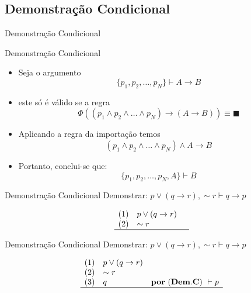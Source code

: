 \subsection{Demonstração Condicional}

\begin{frame}[t]
\vskip 3cm
\begin{center}
{\Huge Demonstração Condicional}
\end{center}
\end{frame}

\begin{frame}[t]{Demonstração Condicional}
	\begin{itemize}
	\item Seja o argumento $$\{p_1, p_2, \ldots, p_N\} \vdash A \rightarrow B$$
	
	\item este só é válido se a regra $$\Phi( (p_1 \wedge p_2 \wedge \ldots \wedge p_N) \rightarrow (A \rightarrow B) ) \equiv \blacksquare$$ 
	
	\item Aplicando a regra da importação temos $$(p_1 \wedge p_2 \wedge \ldots \wedge p_N) \wedge A \rightarrow B$$
	
	\item Portanto, conclui-se que: $$\{p_1, p_2, \ldots, p_N, A \}\vdash B$$
	\end{itemize}
\end{frame}


\begin{frame}[t]{Demonstração Condicional}
	Demonstrar: $p \vee (q \rightarrow r), \sim r \vdash q \rightarrow p$
	
	\vskip 0.5cm
	
	$$\begin{array}{lll}
	(1) & p \vee (q \rightarrow r) & \\
	(2) & \sim r & \\
	\hline
	\end{array}$$	
\end{frame}


\begin{frame}[t]{Demonstração Condicional}
	Demonstrar: $p \vee (q \rightarrow r), \sim r \vdash q \rightarrow p$
	
	\vskip 0.5cm
	
	$$\begin{array}{lll}
	(1) & p \vee (q \rightarrow r) & \\
	(2) & \sim r & \\
	(3) & q & \mathbf{por~(Dem.C)~} \vdash p \\
	\hline
	\end{array}$$	
\end{frame}


